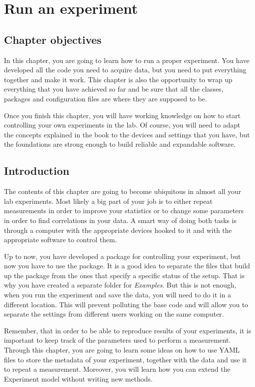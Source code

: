 \chapter{Run an experiment}\label{run-anexperiment}

\section{Chapter objectives}\label{chapterobjectives}
In this chapter, you are going to learn how to run a proper experiment.
You have developed all the code you need to acquire data, but you need
to put everything together and make it work. This chapter is also the
opportunity to wrap up everything that you have achieved so far and be
sure that all the classes, packages and configuration files are where
they are supposed to be.

Once you finish this chapter, you will have working knowledge on how to
start controlling your own experiments in the lab. Of course, you will
need to adapt the concepts explained in the book to the devices and
settings that you have, but the foundations are strong enough to build
reliable and expandable software.

\section{Introduction}\label{introduction}
The contents of this chapter are going to become ubiquitous in almost
all your lab experiments. Most likely a big part of your job is to
either repeat measurements in order to improve your statistics or to
change some parameters in order to find correlations in your data. A
smart way of doing both tasks is through a computer with the appropriate
devices hooked to it and with the appropriate software to control them.

Up to now, you have developed a package for controlling your experiment,
but now you have to use the package. It is a good idea to separate the
files that build up the package from the ones that specify a specific
status of the setup. That is why you have created a separate folder for
\emph{Examples}. But this is not enough, when you run the experiment and
save the data, you will need to do it in a different location. This will
prevent polluting the base code and will allow you to separate the
settings from different users working on the same computer.

Remember, that in order to be able to reproduce results of your
experiments, it is important to keep track of the parameters used to
perform a measurement. Through this chapter, you are going to learn some
ideas on how to use {YAML} files to store the metadata of your
experiment, together with the data and use it to repeat a measurement.
Moreover, you will learn how you can extend the Experiment model without
writing new methods.

